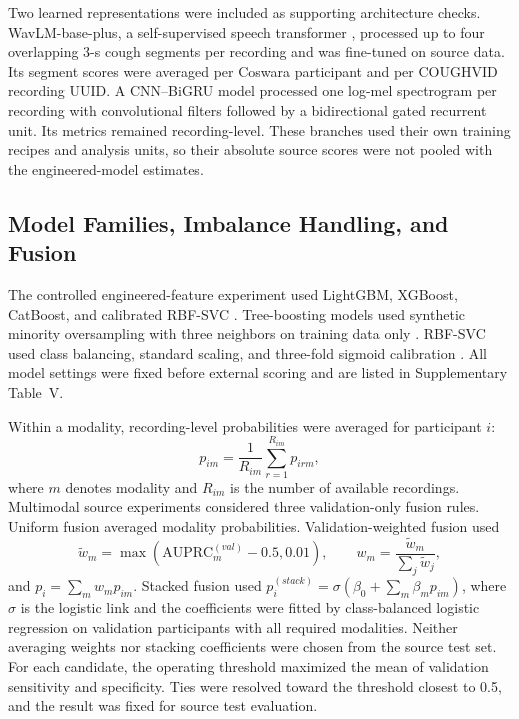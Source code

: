\documentclass[journal]{IEEEtran}
\newcommand{\auprc}{\mathrm{AUPRC}}
\begin{document}
Two learned representations were included as supporting architecture checks. WavLM-base-plus, a self-supervised speech transformer \cite{wang2022wavlm}, processed up to four overlapping 3-s cough segments per recording and was fine-tuned on source data. Its segment scores were averaged per Coswara participant and per COUGHVID recording UUID. A CNN--BiGRU model processed one log-mel spectrogram per recording with convolutional filters followed by a bidirectional gated recurrent unit. Its metrics remained recording-level. These branches used their own training recipes and analysis units, so their absolute source scores were not pooled with the engineered-model estimates.

\subsection{Model Families, Imbalance Handling, and Fusion}

The controlled engineered-feature experiment used LightGBM, XGBoost, CatBoost, and calibrated RBF-SVC \cite{ke2017lightgbm,chen2016xgboost,prokhorenkova2018catboost}. Tree-boosting models used synthetic minority oversampling with three neighbors on training data only \cite{chawla2002smote}. RBF-SVC used class balancing, standard scaling, and three-fold sigmoid calibration \cite{platt1999probabilistic,niculescu2005calibration}. All model settings were fixed before external scoring and are listed in Supplementary Table~V.

Within a modality, recording-level probabilities were averaged for participant $i$:
\begin{equation}
    p_{im}=\frac{1}{R_{im}}\sum_{r=1}^{R_{im}}p_{irm},
\end{equation}
where $m$ denotes modality and $R_{im}$ is the number of available recordings. Multimodal source experiments considered three validation-only fusion rules. Uniform fusion averaged modality probabilities. Validation-weighted fusion used
\begin{equation}
    \tilde{w}_{m}=\max(\auprc_{m}^{(val)}-0.5,0.01), \qquad
    w_m=\frac{\tilde{w}_m}{\sum_j\tilde{w}_j},
\end{equation}
and $p_i=\sum_m w_m p_{im}$. Stacked fusion used $p_i^{(stack)}=\sigma(\beta_0+\sum_m\beta_m p_{im})$, where $\sigma$ is the logistic link and the coefficients were fitted by class-balanced logistic regression on validation participants with all required modalities. Neither averaging weights nor stacking coefficients were chosen from the source test set. For each candidate, the operating threshold maximized the mean of validation sensitivity and specificity. Ties were resolved toward the threshold closest to 0.5, and the result was fixed for source test evaluation.
\end{document}
